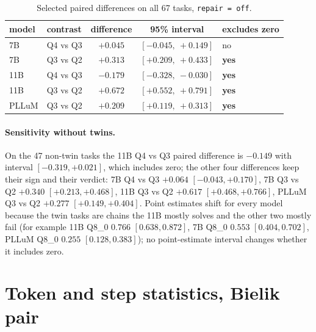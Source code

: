 \documentclass[11pt]{article}
\begin{document}
\begin{table}[h]
\centering\small
\caption{Selected paired differences on all 67 tasks, \texttt{repair\,=\,off}.}
\label{tab:boot-diff}
\begin{tabular}{llccl}
\toprule
model & contrast & difference & 95\% interval & excludes zero \\
\midrule
7B  & Q4 vs Q3 & $+0.045$ & $[-0.045,\ +0.149]$ & no \\
7B  & Q3 vs Q2 & $+0.313$ & $[+0.209,\ +0.433]$ & \textbf{yes} \\
11B & Q4 vs Q3 & $-0.179$ & $[-0.328,\ -0.030]$ & \textbf{yes} \\
11B & Q3 vs Q2 & $+0.672$ & $[+0.552,\ +0.791]$ & \textbf{yes} \\
PLLuM & Q3 vs Q2 & $+0.209$ & $[+0.119,\ +0.313]$ & \textbf{yes} \\
\bottomrule
\end{tabular}
\end{table}

\paragraph{Sensitivity without twins.} On the 47 non-twin tasks the 11B Q4 vs Q3 paired difference is $-0.149$ with interval $[-0.319, +0.021]$, which includes zero; the other four differences keep their sign and their verdict: 7B Q4 vs Q3 $+0.064$ $[-0.043, +0.170]$, 7B Q3 vs Q2 $+0.340$ $[+0.213, +0.468]$, 11B Q3 vs Q2 $+0.617$ $[+0.468, +0.766]$, PLLuM Q3 vs Q2 $+0.277$ $[+0.149, +0.404]$. Point estimates shift for every model because the twin tasks are chains the 11B mostly solves and the other two mostly fail (for example 11B Q8\_0 $0.766$ $[0.638, 0.872]$, 7B Q8\_0 $0.553$ $[0.404, 0.702]$, PLLuM Q8\_0 $0.255$ $[0.128, 0.383]$); no point-estimate interval changes whether it includes zero.

\FloatBarrier
\Needspace*{0.45\textheight}
\section{Token and step statistics, Bielik pair}
\label{app:tokens}
\end{document}
